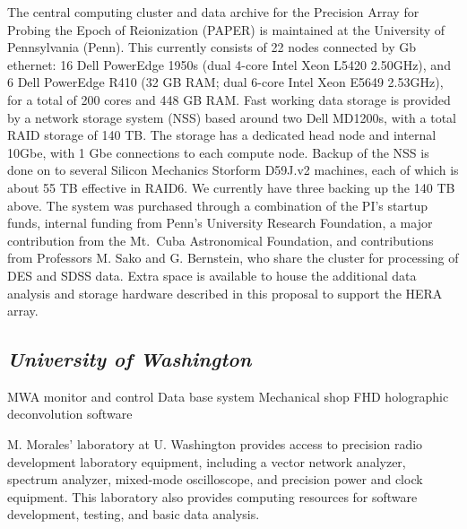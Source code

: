 \documentclass[11pt]{article}
\begin{document}
The central computing cluster and data archive for the Precision Array for Probing the Epoch of Reionization (PAPER) is maintained at the University of Pennsylvania (Penn).  This currently consists of 22 nodes connected by Gb ethernet: 16 Dell PowerEdge 1950s (dual 4-core Intel Xeon L5420 \@ 2.50GHz), and 6 Dell PowerEdge R410 (32 GB RAM; dual 6-core Intel Xeon E5649 \@ 2.53GHz), for a total of 200 cores and 448 GB RAM.  Fast working data storage is provided by a network storage system (NSS) based around two Dell MD1200s, with a total RAID storage of 140 TB.  The storage has a dedicated head node and internal 10Gbe, with 1 Gbe connections to each compute node. Backup of the NSS is done on to several Silicon Mechanics Storform D59J.v2 machines, each of which is about 55 TB effective in RAID6.  We currently have three backing up the 140 TB above. The system was purchased through a combination of the PI's startup funds, internal funding from Penn's University Research Foundation, a major contribution from the Mt.~Cuba Astronomical Foundation, and contributions from Professors M. Sako and G. Bernstein, who share the cluster for processing of DES and SDSS data.  Extra space is available to house the additional data analysis and storage hardware described in this proposal to support the HERA array.


\subsection{\it University of Washington}

MWA monitor and control Data base system
Mechanical shop
FHD holographic deconvolution software

M. Morales' laboratory at U. Washington provides access to precision radio
development laboratory equipment, including
a vector network analyzer, spectrum analyzer, mixed-mode oscilloscope, and
precision power and clock equipment.  This laboratory also provides computing
resources for software development, testing, and basic data analysis.
\end{document}
